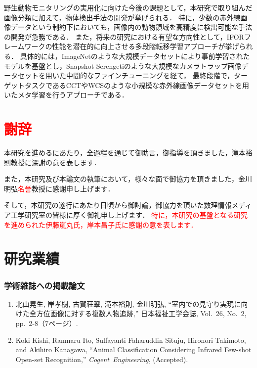 \documentclass[a4paper,11pt,nomag]{jsreport}
\begin{document}
野生動物モニタリングの実用化に向けた今後の課題として，本研究で取り組んだ画像分類に加えて，物体検出手法の開発が挙げられる．
特に，少数の赤外線画像データという制約下においても，画像内の動物領域を高精度に検出可能な手法の開発が急務である．
また，将来の研究における有望な方向性として，IFORフレームワークの性能を潜在的に向上させる多段階転移学習アプローチが挙げられる．
具体的には，ImageNetのような大規模データセットにより事前学習されたモデルを基盤とし，Snapshot Serengetiのような大規模なカメラトラップ画像データセットを用いた中間的なファインチューニングを経て，
最終段階で，ターゲットタスクであるCCTやWCSのような小規模な赤外線画像データセットを用いたメタ学習を行うアプローチである．

\chapter*{\textcolor{red}{謝辞}}

本研究を進めるにあたり，全過程を通じて御助言，御指導を頂きました，滝本裕則教授に深謝の意を表します．

また，本研究及び本論文の執筆において，様々な面で御協力を頂きました，金川明弘\textcolor{red}{名誉}教授に感謝申し上げます．

そして，本研究の遂行にあたり日頃から御討論，御協力を頂いた数理情報メディア工学研究室の皆様に厚く御礼申し上げます．
\textcolor{red}{特に，本研究の基盤となる研究を進められた伊藤嵐丸氏，岸本昌子氏に感謝の意を表します．}

\chapter*{研究業績}

\subsection*{学術雑誌への掲載論文}
\begin{enumerate}
  \item 北山晃生, 岸孝樹, 古賀荘翠, 滝本裕則, 金川明弘, ``室内での見守り実現に向けた全方位画像に対する複数人物追跡,'' 日本福祉工学会誌, Vol.~26, No.~2, pp.~2-8（7ページ）.
  \item Koki Kishi, Ranmaru Ito, Sulfayanti Faharuddin Situju, Hironori Takimoto, and Akihiro Kanagawa, ``Animal Classification Considering Infrared Few-shot Open-set Recognition,'' \mbox{\textit{Cogent Engineering}}, (Accepted).
\end{enumerate}
\end{document}

